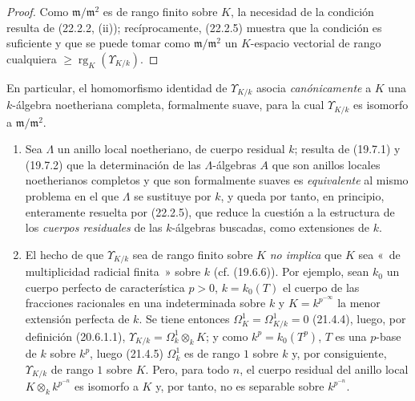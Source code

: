 \begin{proof}
Como $\mathfrak m/\mathfrak m^2$ es de rango finito sobre $K$, la necesidad
de la condición resulta de (22.2.2, (ii)); recíprocamente, (22.2.5) muestra que
la condición es suficiente y que se puede tomar como
$\mathfrak m/\mathfrak m^2$ un $K$-espacio vectorial de rango cualquiera
$\geqslant\operatorname{rg}_K(\Upsilon_{K/k})$.
\end{proof}


En particular, el homomorfismo identidad de $\Upsilon_{K/k}$ asocia
\emph{canónicamente} a $K$ una $k$-álgebra noetheriana completa, formalmente
suave, para la cual $\Upsilon_{K/k}$ es isomorfo a
$\mathfrak m/\mathfrak m^2$.

\begin{remarks}[22.2.7]
\label{0.22.2.7-fr}
\begin{enumerate}
  \item[(i)] Sea $\Lambda$ un anillo local noetheriano, de cuerpo residual
  $k$; resulta de (19.7.1) y (19.7.2) que la determinación de las
  $\Lambda$-álgebras $A$ que son anillos locales noetherianos completos y que
  son formalmente suaves es \emph{equivalente} al mismo problema en el que
  $\Lambda$ se sustituye por $k$, y queda por tanto, en principio, enteramente
  resuelta por (22.2.5), que reduce la cuestión a la estructura de los
  \emph{cuerpos residuales} de las $k$-álgebras buscadas, como extensiones de
  $k$.

  \item[(ii)] El hecho de que $\Upsilon_{K/k}$ sea de rango finito sobre $K$
  \emph{no implica} que $K$ sea «~de multiplicidad radicial finita~» sobre
  $k$ (cf. (19.6.6)). Por ejemplo, sean $k_0$ un cuerpo perfecto de
  característica $p>0$, $k=k_0(T)$ el cuerpo de las fracciones racionales en
  una indeterminada sobre $k$ y $K=k^{p^{-\infty}}$ la menor extensión
  perfecta de $k$. Se tiene entonces $\Omega^1_K=\Omega^1_{K/k}=0$ (21.4.4),
  luego, por definición (20.6.1.1),
  $\Upsilon_{K/k}=\Omega^1_k\otimes_kK$; y como $k^p=k_0(T^p)$, $T$ es una
  $p$-base de $k$ sobre $k^p$, luego (21.4.5) $\Omega^1_k$ es de rango $1$
  sobre $k$ y, por consiguiente, $\Upsilon_{K/k}$ de rango $1$ sobre $K$.
  Pero, para todo $n$, el cuerpo residual del anillo local
  $K\otimes_kk^{p^{-n}}$ es isomorfo a $K$ y, por tanto, no es separable sobre
  $k^{p^{-n}}$.
\end{enumerate}
\end{remarks}

